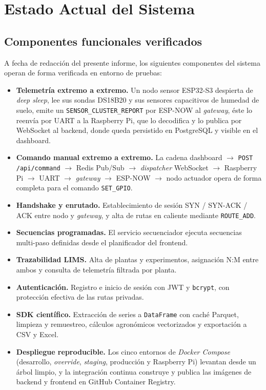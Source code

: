 \chapter{Estado Actual del Sistema}
\label{cap:estado}

\section{Componentes funcionales verificados}

A fecha de redacci\'on del presente informe, los siguientes componentes
del sistema operan de forma verificada en entorno de pruebas:

\begin{itemize}[leftmargin=*]
    \item \textbf{Telemetr\'ia extremo a extremo.} Un nodo sensor
    ESP32-S3 despierta de \textit{deep sleep}, lee sus sondas DS18B20 y
    sus sensores capacitivos de humedad de suelo, emite un
    \texttt{SENSOR\_CLUSTER\_REPORT} por ESP-NOW al \textit{gateway},
    \'este lo reenv\'ia por UART a la Raspberry Pi, que lo decodifica y lo
    publica por WebSocket al backend, donde queda persistido en
    PostgreSQL y visible en el dashboard.
    \item \textbf{Comando manual extremo a extremo.} La cadena
    dashboard $\to$ \texttt{POST /api/command} $\to$ Redis Pub/Sub $\to$
    \textit{dispatcher} WebSocket $\to$ Raspberry Pi $\to$ UART $\to$
    \textit{gateway} $\to$ ESP-NOW $\to$ nodo actuador opera de forma
    completa para el comando \texttt{SET\_GPIO}.
    \item \textbf{Handshake y enrutado.} Establecimiento de sesi\'on
    SYN / SYN-ACK / ACK entre nodo y \textit{gateway}, y alta de rutas en
    caliente mediante \texttt{ROUTE\_ADD}.
    \item \textbf{Secuencias programadas.} El servicio secuenciador
    ejecuta secuencias multi-paso definidas desde el planificador del
    frontend.
    \item \textbf{Trazabilidad LIMS.} Alta de plantas y experimentos,
    asignaci\'on N:M entre ambos y consulta de telemetr\'ia filtrada por
    planta.
    \item \textbf{Autenticaci\'on.} Registro e inicio de sesi\'on con JWT
    y \texttt{bcrypt}, con protecci\'on efectiva de las rutas privadas.
    \item \textbf{SDK cient\'ifico.} Extracci\'on de series a
    \texttt{DataFrame} con cach\'e Parquet, limpieza y remuestreo,
    c\'alculos agron\'omicos vectorizados y exportaci\'on a CSV y Excel.
    \item \textbf{Despliegue reproducible.} Los cinco entornos de
    \textit{Docker Compose} (desarrollo, \textit{override},
    \textit{staging}, producci\'on y Raspberry Pi) levantan desde un
    \'arbol limpio, y la integraci\'on continua construye y publica las
    im\'agenes de backend y frontend en GitHub Container Registry.
\end{itemize}

